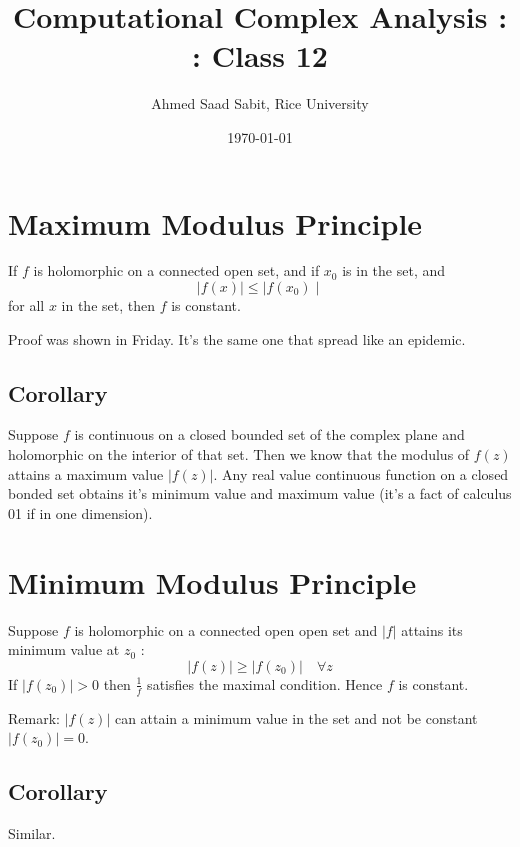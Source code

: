 \documentclass[letter]{article}
\title{Computational Complex Analysis : : Class 12}
\author{Ahmed Saad Sabit, Rice University}
\date{\today}
\begin{document}
\maketitle

\section*{Maximum Modulus Principle} 
If $f$ is holomorphic on a connected open set, and  if $ x_0$ is in the set, and 
\[
 \mid f(x) \mid  \le  \mid  f(x_0)  \mid  
\] for all $x$ in the set, then $f$ is constant. 

Proof was shown in Friday. It's the same one that spread like an epidemic.

\subsection*{Corollary} 
Suppose $f$ is continuous on a closed bounded set of the complex plane and holomorphic on the interior of that set. Then we know that the modulus of $f(z)$ attains a maximum value $|f(z)|$. Any real value continuous function on a closed bonded set obtains it's minimum value and maximum value (it's a fact of calculus 01 if in one dimension). 

\section*{Minimum Modulus Principle} 
Suppose $f$ is holomorphic on a connected open open set and $|f |$ attains its minimum value at $z_0$ : 
\[
|f(z)| \ge |f(z_0)| \quad \forall z
\] 
If $|f(z_0)| > 0 $ then $\frac{1}{f}$ satisfies the maximal condition. Hence $f$ is constant. 

Remark: $|f(z)|$ can attain a minimum value in the set and not be constant $|f(z_0)
| = 0$. 

\subsection*{Corollary} 
Similar. 
\end{document}
